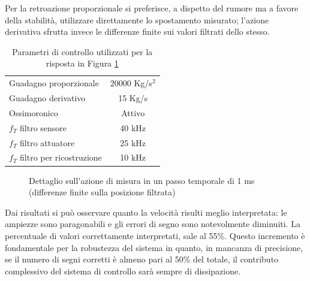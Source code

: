 Per la retroazione proporzionale si preferisce, a dispetto del rumore ma a favore della stabilità,  utilizzare direttamente lo spostamento misurato; l'azione derivativa sfrutta invece le differenze finite sui valori filtrati dello stesso.

\begin{table}
\centering
\footnotesize
\begin{tabular}{lc}
\toprule
Guadagno proporzionale & 20000 Kg/s$^2$\\
Guadagno derivativo & 15 Kg/s\\
Ossimoronico & Attivo\\
$f_T$ filtro sensore & 40 kHz\\
$f_T$ filtro attuatore & 25 kHz\\
$f_T$ filtro per ricostruzione & 10 kHz\\
\bottomrule
\end{tabular}
\label{tab:8story5}
\caption{Parametri di controllo utilizzati per la risposta in Figura \ref{fig:81step.1}}
\end{table}
\begin{figure}[htb]
\footnotesize
\centering
{}
\caption{Dettaglio sull'azione di misura in un passo temporale di 1 ms (differenze finite sulla posizione filtrata)}
\label{fig:81step.1}
\end{figure}
Dai risultati si può osservare quanto la velocità risulti meglio interpretata: le ampiezze sono paragonabili e gli errori di segno sono notevolmente diminuiti. La percentuale di valori correttamente interpretati, sale al 55\%. Questo incremento è fondamentale per la robustezza del sistema in quanto, in mancanza di precisione, se il numero di segni corretti è almeno pari al 50\% del totale, il contributo complessivo del sistema di controllo sarà sempre di dissipazione.

